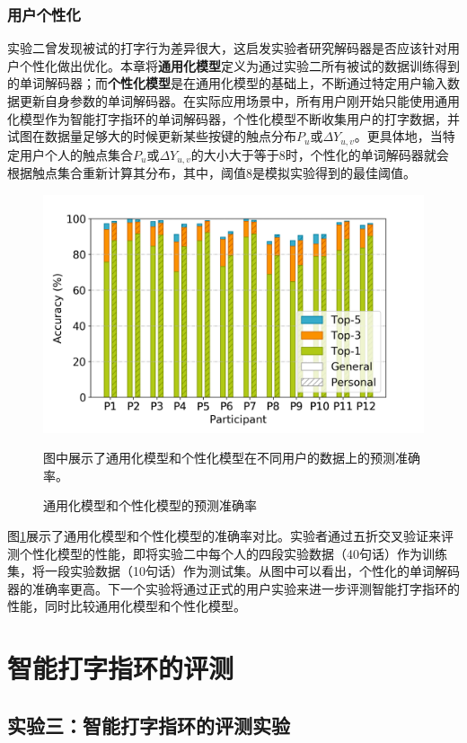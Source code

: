 \subsubsection{用户个性化}

实验二曾发现被试的打字行为差异很大，这启发实验者研究解码器是否应该针对用户个性化做出优化。本章将\textbf{通用化模型}定义为通过实验二所有被试的数据训练得到的单词解码器；而\textbf{个性化模型}是在通用化模型的基础上，不断通过特定用户输入数据更新自身参数的单词解码器。在实际应用场景中，所有用户刚开始只能使用通用化模型作为智能打字指环的单词解码器，个性化模型不断收集用户的打字数据，并试图在数据量足够大的时候更新某些按键的触点分布$P_u$或$\Delta{Y}_{u,v}$。更具体地，当特定用户个人的触点集合$P_u$或$\Delta{Y}_{u,v}$的大小大于等于8时，个性化的单词解码器就会根据触点集合重新计算其分布，其中，阈值8是模拟实验得到的最佳阈值。

\begin{figure}[!htbp]
	\centering
	\includegraphics[width=0.8\linewidth]{figures/general_vs_personal.png}
	\caption*{图中展示了通用化模型和个性化模型在不同用户的数据上的预测准确率。}
	\caption{通用化模型和个性化模型的预测准确率}
	\label{fig:general_vs_personal}
\end{figure}

图\ref{fig:general_vs_personal}展示了通用化模型和个性化模型的准确率对比。实验者通过五折交叉验证来评测个性化模型的性能，即将实验二中每个人的四段实验数据（40句话）作为训练集，将一段实验数据（10句话）作为测试集。从图中可以看出，个性化的单词解码器的准确率更高。下一个实验将通过正式的用户实验来进一步评测智能打字指环的性能，同时比较通用化模型和个性化模型。

\section{智能打字指环的评测}

\subsection{实验三：智能打字指环的评测实验}

